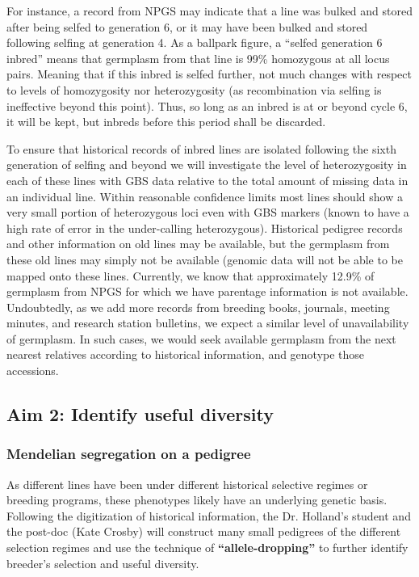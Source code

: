 \documentclass[final,12pt]{article}
\begin{document}
For instance, a record from NPGS may indicate that a line was bulked and stored after being selfed to generation 6, or it may have been bulked and stored following selfing at generation 4. As a ballpark figure, a ``selfed generation 6 inbred'' means that germplasm from that line is 99\% homozygous at all locus pairs. 
Meaning that if this inbred is selfed further, not much changes with respect to levels of homozygosity nor heterozygosity (as recombination via selfing is ineffective beyond this point).  
Thus, so long as an inbred is at or beyond cycle 6, it will be kept, but inbreds before this period shall be discarded.

To ensure that historical records of inbred lines are isolated following the sixth generation of selfing and beyond we will investigate the level of heterozygosity in each of these lines with GBS data relative to the total amount of missing data in an individual line. 
Within reasonable confidence limits most lines should show a very small portion of heterozygous loci even with GBS markers (known to have a high rate of error in the under-calling heterozygous). 
Historical pedigree records and other information on old lines may be available, but the germplasm from these old lines may simply not be available (genomic data will not be able to be mapped onto these lines. 
Currently, we know that approximately 12.9\% of germplasm from NPGS for which we have parentage information is not available. 
Undoubtedly, as we add more records from breeding books, journals, meeting minutes, and research station bulletins, we expect a similar level of unavailability of germplasm.  
In such cases, we would seek available germplasm from the next nearest relatives according to historical information, and genotype those accessions. 

\subsection*{Aim 2: Identify useful diversity}

\subsubsection*{Mendelian segregation on a pedigree}
As different lines have been under different historical selective regimes or breeding programs, these phenotypes likely have an underlying genetic basis. Following the digitization of historical information, the Dr. Holland's student and the post-doc (Kate Crosby) will construct many small pedigrees of the different selection regimes and use the technique of \textbf{``allele-dropping''} to further identify breeder's selection and useful diversity. 
\end{document}

